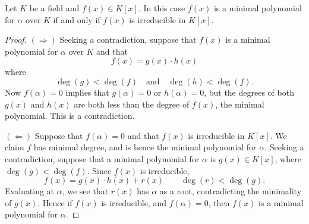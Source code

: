 \documentclass{ximera}
\begin{document}
\begin{lemma}\label{L:ipi}
  Let $K$ be a field and $f(x)\in K[x]$. In this case $f(x)$ is a
  minimal polynomial for $\alpha$ over $K$ if and only if $f(x)$ is
  irreducible in $K[x]$.
  \begin{proof}
    $(\Rightarrow)$ Seeking a contradiction, suppose that $f(x)$ is a
    minimal polynomial for $\alpha$ over $K$ and that
    \[
    f(x) = g(x) \cdot h(x) 
    \]
    where
    \[
    \deg(g) <\deg(f)\quad\text{and}\quad\deg(h) <\deg(f).
    \]
    Now $f(\alpha) = 0$ implies that $g(\alpha) =0$ or $h(\alpha) =
    0$, but the degrees of both $g(x)$ and $h(x)$ are both less than
    the degree of $f(x)$, the minimal polynomial. This is a
    contradiction.

    $(\Leftarrow)$ Suppose that $f(\alpha) = 0$ and that $f(x)$ is
    irreducible in $K[x]$. We claim $f$ has minimal degree, and is
    hence the minimal polynomial for $\alpha$. Seeking a
    contradiction, suppose that a minimal polynomial for $\alpha$ is
    $g(x)\in K[x]$, where $\deg(g) < \deg(f)$. Since $f(x)$ is irreducible,
    \[
    f(x) = g(x) \cdot h(x) + r(x) \qquad \deg(r)<\deg(g).
    \]
    Evaluating at $\alpha$, we see that $r(x)$ has $\alpha$ as a root,
    contradicting the minimality of $g(x)$. Hence if $f(x)$ is
    irreducible, and $f(\alpha) = 0$, then $f(x)$ is a minimal
    polynomial for $\alpha$.
  \end{proof}
\end{lemma}
\end{document}
